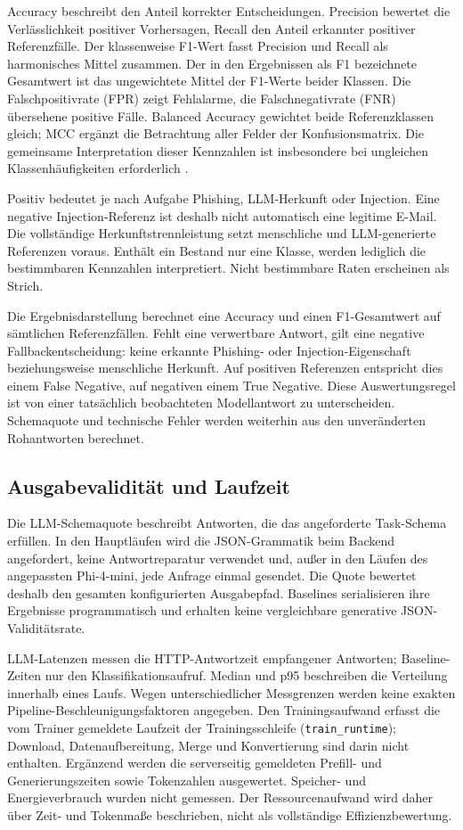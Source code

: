 \documentclass[12pt,twoside=false,a4paper,parskip]{scrbook}
\begin{document}
Accuracy beschreibt den Anteil korrekter Entscheidungen. Precision bewertet die Verlässlichkeit positiver Vorhersagen, Recall den Anteil erkannter positiver Referenzfälle. Der klassenweise F1-Wert fasst Precision und Recall als harmonisches Mittel zusammen. Der in den Ergebnissen als F1 bezeichnete Gesamtwert ist das ungewichtete Mittel der F1-Werte beider Klassen. Die Falschpositivrate (FPR) zeigt Fehlalarme, die Falschnegativrate (FNR) übersehene positive Fälle. Balanced Accuracy gewichtet beide Referenzklassen gleich; MCC ergänzt die Betrachtung aller Felder der Konfusionsmatrix. Die gemeinsame Interpretation dieser Kennzahlen ist insbesondere bei ungleichen Klassenhäufigkeiten erforderlich \cite{powers2020evaluation,zhang2025benchmarking}.

Positiv bedeutet je nach Aufgabe Phishing, LLM-Herkunft oder Injection. Eine negative Injection-Referenz ist deshalb nicht automatisch eine legitime E-Mail. Die vollständige Herkunftstrennleistung setzt menschliche und LLM-generierte Referenzen voraus. Enthält ein Bestand nur eine Klasse, werden lediglich die bestimmbaren Kennzahlen interpretiert. Nicht bestimmbare Raten erscheinen als Strich.

Die Ergebnisdarstellung berechnet eine Accuracy und einen F1-Gesamtwert auf sämtlichen Referenzfällen. Fehlt eine verwertbare Antwort, gilt eine negative Fallbackentscheidung: keine erkannte Phishing- oder Injection-Eigenschaft beziehungsweise menschliche Herkunft. Auf positiven Referenzen entspricht dies einem False Negative, auf negativen einem True Negative. Diese Auswertungsregel ist von einer tatsächlich beobachteten Modellantwort zu unterscheiden. Schemaquote und technische Fehler werden weiterhin aus den unveränderten Rohantworten berechnet.

\subsection{Ausgabevalidität und Laufzeit}

Die LLM-Schemaquote beschreibt Antworten, die das angeforderte Task-Schema erfüllen. In den Hauptläufen wird die JSON-Grammatik beim Backend angefordert, keine Antwortreparatur verwendet und, außer in den Läufen des angepassten Phi-4-mini, jede Anfrage einmal gesendet. Die Quote bewertet deshalb den gesamten konfigurierten Ausgabepfad. Baselines serialisieren ihre Ergebnisse programmatisch und erhalten keine vergleichbare generative JSON-Validitätsrate.

LLM-Latenzen messen die HTTP-Antwortzeit empfangener Antworten; Baseline-Zeiten nur den Klassifikationsaufruf. Median und p95 beschreiben die Verteilung innerhalb eines Laufs. Wegen unterschiedlicher Messgrenzen werden keine exakten Pipeline-Beschleunigungsfaktoren angegeben. Den Trainingsaufwand erfasst die vom Trainer gemeldete Laufzeit der Trainingsschleife (\texttt{train\_runtime}); Download, Datenaufbereitung, Merge und Konvertierung sind darin nicht enthalten. Ergänzend werden die serverseitig gemeldeten Prefill- und Generierungszeiten sowie Tokenzahlen ausgewertet. Speicher- und Energieverbrauch wurden nicht gemessen. Der Ressourcenaufwand wird daher über Zeit- und Tokenmaße beschrieben, nicht als vollständige Effizienzbewertung.
\end{document}
